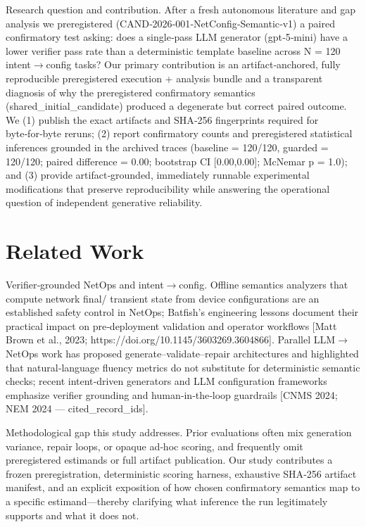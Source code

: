 \documentclass[conference]{IEEEtran}
\begin{document}
Research question and contribution. After a fresh autonomous literature and gap analysis we preregistered (CAND‑2026‑001‑NetConfig‑Semantic‑v1) a paired confirmatory test asking: does a single‑pass LLM generator (gpt‑5‑mini) have a lower verifier pass rate than a deterministic template baseline across N = 120 intent\ensuremath{\rightarrow}config tasks? Our primary contribution is an artifact‑anchored, fully reproducible preregistered execution + analysis bundle and a transparent diagnosis of why the preregistered confirmatory semantics (shared\_initial\_candidate) produced a degenerate but correct paired outcome. We (1) publish the exact artifacts and SHA‑256 fingerprints required for byte‑for‑byte reruns; (2) report confirmatory counts and preregistered statistical inferences grounded in the archived traces (baseline = 120/120, guarded = 120/120; paired difference = 0.00; bootstrap CI [0.00,0.00]; McNemar p = 1.0); and (3) provide artifact‑grounded, immediately runnable experimental modifications that preserve reproducibility while answering the operational question of independent generative reliability.

\section{Related Work}
Verifier‑grounded NetOps and intent\ensuremath{\rightarrow}config. Offline semantics analyzers that compute network final/ transient state from device configurations are an established safety control in NetOps; Batfish's engineering lessons document their practical impact on pre‑deployment validation and operator workflows [Matt Brown et al., 2023; https://doi.org/10.1145/3603269.3604866]. Parallel LLM\ensuremath{\rightarrow}NetOps work has proposed generate--validate--repair architectures and highlighted that natural‑language fluency metrics do not substitute for deterministic semantic checks; recent intent‑driven generators and LLM configuration frameworks emphasize verifier grounding and human‑in‑the‑loop guardrails [CNMS 2024; NEM 2024 --- cited\_record\_ids].

Methodological gap this study addresses. Prior evaluations often mix generation variance, repair loops, or opaque ad‑hoc scoring, and frequently omit preregistered estimands or full artifact publication. Our study contributes a frozen preregistration, deterministic scoring harness, exhaustive SHA‑256 artifact manifest, and an explicit exposition of how chosen confirmatory semantics map to a specific estimand---thereby clarifying what inference the run legitimately supports and what it does not.
\end{document}
